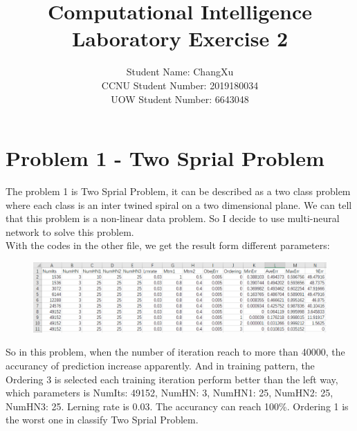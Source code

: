 \documentclass[runningheads]{llncs}
\begin{document}
\title{\large{Computational Intelligence Laboratory Exercise 2}}
\author{\large{Student Name: ChangXu \\ %
CCNU Student Number: 2019180034 \\ %
UOW Student Number: 6643048}}  %



\maketitle



\section{Problem 1 - Two Sprial Problem}
The 
problem 1 is Two Sprial Problem, 
it can be described as a two class problem
 where each class is an inter twined spiral on a two
dimensional plane. We can tell that this problem is a non-linear data problem. So I decide to use multi-neural network to solve this
problem.\\
With the codes in the other file, we get the result form different parameters:\\
\begin{figure}[H]
    \centering
    \includegraphics[scale=0.7]{data1.PNG}  
\end{figure}
So in this problem, when the number of iteration reach to more 
than 40000, the accurancy of prediction increase apparently. And
in training pattern, the Ordering 3 is selected each training
iteration perform better than the left way, which parameters is 
NumIts: 49152, NumHN: 3, NumHN1: 25, NumHN2: 25, NumHN3: 25. Lerning
rate is 0.03. The accurancy can reach 100\%.
Ordering 1 is the worst one in classify Two Sprial Problem. 
\end{document}
